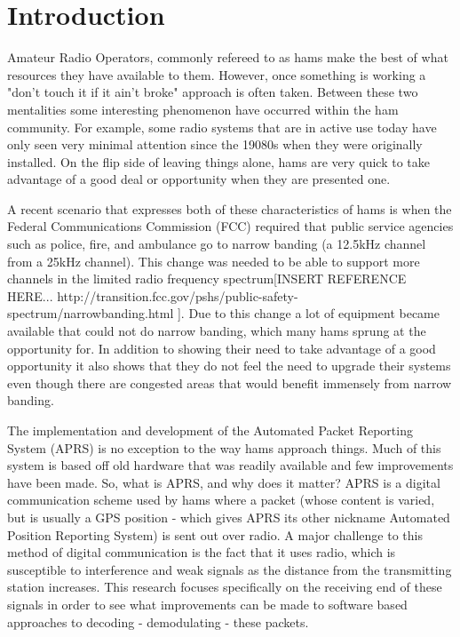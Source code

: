 \chapter{Introduction}

Amateur Radio Operators, commonly refereed to as hams make the best of what resources they have available to them. However, once something is working a "don't touch it if it ain't broke" approach is often taken. Between these two mentalities some interesting phenomenon have occurred within the ham community. For example, some radio systems that are in active use today have only seen very minimal attention since the 19080s when they were originally installed. On the flip side of leaving things alone, hams are very quick to take advantage of a good deal or opportunity when they are presented one.

A recent scenario that expresses both of these characteristics of hams is when the Federal Communications Commission (FCC) required that public service agencies such as police, fire, and ambulance go to narrow banding (a 12.5kHz channel from a 25kHz channel). This change was needed to be able to support more channels in the limited radio frequency spectrum[INSERT REFERENCE HERE... http://transition.fcc.gov/pshs/public-safety-spectrum/narrowbanding.html ]. Due to this change a lot of equipment became available that could not do narrow banding, which many hams sprung at the opportunity for. In addition to showing their need to take advantage of a good opportunity it also shows that they do not feel the need to upgrade their systems even though there are congested areas that would benefit immensely from narrow banding.

The implementation and development of the Automated Packet Reporting System (APRS) is no exception to the way hams approach things. Much of this system is based off old hardware that was readily available and few improvements have been made. So, what is APRS, and why does it matter? APRS is a digital communication scheme used by hams where a packet (whose content is varied, but is usually a GPS position - which gives APRS its other nickname Automated Position Reporting System) is sent out over radio. A major challenge to this method of digital communication is the fact that it uses radio, which is susceptible to interference and weak signals as the distance from the transmitting station increases. This research focuses specifically on the receiving end of these signals in order to see what improvements can be made to software based approaches to decoding - demodulating - these packets. 

